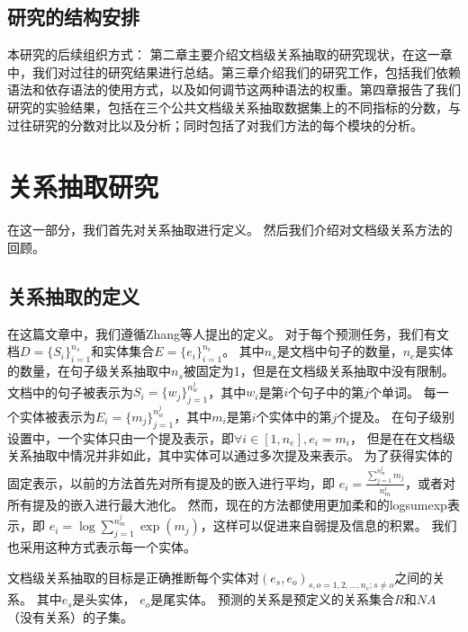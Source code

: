 \documentclass[bachelor]{thesis-uestc}
\begin{document}
\section{研究的结构安排}
本研究的后续组织方式： 第二章主要介绍文档级关系抽取的研究现状，在这一章中，我们对过往的研究结果进行总结。第三章介绍我们的研究工作，包括我们依赖语法和依存语法的使用方式，以及如何调节这两种语法的权重。第四章报告了我们研究的实验结果，包括在三个公共文档级关系抽取数据集上的不同指标的分数，与过往研究的分数对比以及分析；同时包括了对我们方法的每个模块的分析。

\chapter{关系抽取研究}
在这一部分，我们首先对关系抽取进行定义。
然后我们介绍对文档级关系方法的回顾。
\section{关系抽取的定义}

在这篇文章中，我们遵循Zhang等人提出的定义。
对于每个预测任务，我们有文档$D=\{S_i\}_{i=1}^{n_s}$和实体集合$E=\{e_i\}_{i=1}^{n_e}$。
其中$n_s$是文档中句子的数量，$n_e$是实体的数量，在句子级关系抽取中$n_s$被固定为1，但是在文档级关系抽取中没有限制。
文档中的句子被表示为$S_i=\{w_j\}_{j=1}^{n_w^j}$，其中$w_i$是第$i$个句子中的第$j$个单词。
每一个实体被表示为$E_i=\{m_j\}_{j=1}^{n_w^j}$，其中$m_i$是第$i$个实体中的第$j$个提及。
在句子级别设置中，一个实体只由一个提及表示，即$\forall i \in [1, n_e], e_i = m_i$， 但是在在文档级关系抽取中情况并非如此，其中实体可以通过多次提及来表示。
为了获得实体的固定表示，以前的方法首先对所有提及的嵌入进行平均，即 $e_i = \frac{\sum_{j=1}^{n_m^j} m_j}{n_m^i}$，或者对所有提及的嵌入进行最大池化。
然而，现在的方法都使用更加柔和的logsumexp表示，即 $e_i = \log \sum_{j=1}^{n_m^j} \exp(m_j)$，这样可以促进来自弱提及信息的积累。
我们也采用这种方式表示每一个实体。\par

文档级关系抽取的目标是正确推断每个实体对$(e_s,e_o)_{s,o = 1, 2, \dots, n_e; s \neq o}$之间的关系。
其中$e_s$是头实体， $e_o$是尾实体。
预测的关系是预定义的关系集合$R$和$NA$（没有关系）的子集。
\end{document}
